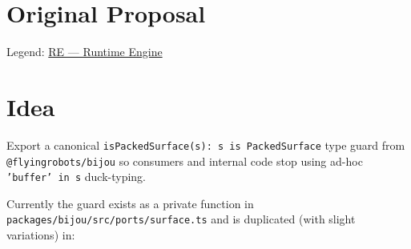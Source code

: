 \section{Original Proposal}\label{record-375-original-proposal}

Legend: \href{https://github.com/flyingrobots/bijou/blob/1853ad902f6bf219326409e7f743a5a1d6517dbc/docs/method/legends/RE-runtime-engine.md}{RE --- Runtime Engine}

\section{Idea}\label{record-375-idea}

Export a canonical \texttt{i\allowbreak{}s\allowbreak{}P\allowbreak{}a\allowbreak{}c\allowbreak{}k\allowbreak{}e\allowbreak{}d\allowbreak{}S\allowbreak{}u\allowbreak{}r\allowbreak{}f\allowbreak{}a\allowbreak{}c\allowbreak{}e\allowbreak{}(\allowbreak{}s\allowbreak{})\allowbreak{}:\allowbreak{} \allowbreak{}s\allowbreak{} \allowbreak{}i\allowbreak{}s\allowbreak{} \allowbreak{}P\allowbreak{}a\allowbreak{}c\allowbreak{}k\allowbreak{}e\allowbreak{}d\allowbreak{}S\allowbreak{}u\allowbreak{}r\allowbreak{}f\allowbreak{}a\allowbreak{}c\allowbreak{}e} type guard from \texttt{@\allowbreak{}f\allowbreak{}l\allowbreak{}y\allowbreak{}i\allowbreak{}n\allowbreak{}g\allowbreak{}r\allowbreak{}o\allowbreak{}b\allowbreak{}o\allowbreak{}t\allowbreak{}s\allowbreak{}/\allowbreak{}b\allowbreak{}i\allowbreak{}j\allowbreak{}o\allowbreak{}u} so consumers and internal code stop using ad-hoc \texttt{'\allowbreak{}b\allowbreak{}u\allowbreak{}f\allowbreak{}f\allowbreak{}e\allowbreak{}r\allowbreak{}'\allowbreak{} \allowbreak{}i\allowbreak{}n\allowbreak{} \allowbreak{}s} duck-typing.

Currently the guard exists as a private function in \texttt{p\allowbreak{}a\allowbreak{}c\allowbreak{}k\allowbreak{}a\allowbreak{}g\allowbreak{}e\allowbreak{}s\allowbreak{}/\allowbreak{}b\allowbreak{}i\allowbreak{}j\allowbreak{}o\allowbreak{}u\allowbreak{}/\allowbreak{}s\allowbreak{}r\allowbreak{}c\allowbreak{}/\allowbreak{}p\allowbreak{}o\allowbreak{}r\allowbreak{}t\allowbreak{}s\allowbreak{}/\allowbreak{}s\allowbreak{}u\allowbreak{}r\allowbreak{}f\allowbreak{}a\allowbreak{}c\allowbreak{}e\allowbreak{}.\allowbreak{}t\allowbreak{}s} and is duplicated (with slight variations) in:

